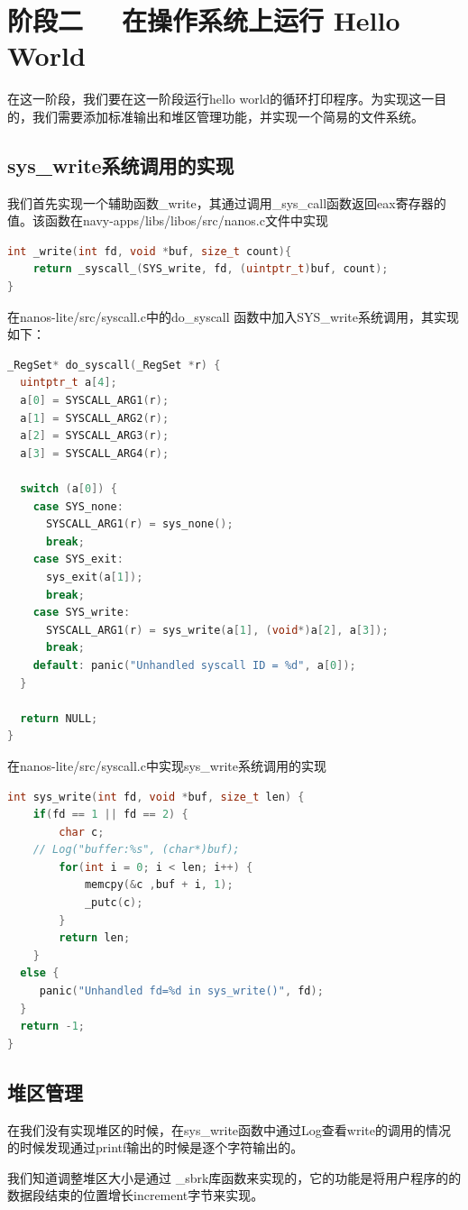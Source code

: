 \documentclass[UTF8,a4paper,10pt]{ctexart}
\begin{document}
\section{阶段二 \ \ 
在操作系统上运行 Hello World}
在这一阶段，我们要在这一阶段运行hello world的循环打印程序。为实现这一目的，我们需要添加标准输出和堆区管理功能，并实现一个简易的文件系统。
\subsection{sys\_write系统调用的实现}
我们首先实现一个辅助函数\_write，其通过调用\_sys\_call函数返回eax寄存器的值。该函数在navy-apps/libs/libos/src/nanos.c文件中实现
\begin{lstlisting}[language = C++]
int _write(int fd, void *buf, size_t count){
    return _syscall_(SYS_write, fd, (uintptr_t)buf, count);
}
\end{lstlisting}
在nanos-lite/src/syscall.c中的do\_syscall 函数中加入SYS\_write系统调用，其实现如下：
\begin{lstlisting}[language = C++]
_RegSet* do_syscall(_RegSet *r) {
  uintptr_t a[4];
  a[0] = SYSCALL_ARG1(r);
  a[1] = SYSCALL_ARG2(r);
  a[2] = SYSCALL_ARG3(r);
  a[3] = SYSCALL_ARG4(r);

  switch (a[0]) {
    case SYS_none: 
      SYSCALL_ARG1(r) = sys_none();
      break;
    case SYS_exit: 
      sys_exit(a[1]);
      break;
    case SYS_write:
      SYSCALL_ARG1(r) = sys_write(a[1], (void*)a[2], a[3]);
      break; 
    default: panic("Unhandled syscall ID = %d", a[0]);
  }

  return NULL;
}
\end{lstlisting}
在nanos-lite/src/syscall.c中实现sys\_write系统调用的实现
\begin{lstlisting}[language = C++]
int sys_write(int fd, void *buf, size_t len) {
	if(fd == 1 || fd == 2) {
		char c;
    // Log("buffer:%s", (char*)buf);
		for(int i = 0; i < len; i++) {
			memcpy(&c ,buf + i, 1);
			_putc(c);
		}
		return len;
	}
  else {
     panic("Unhandled fd=%d in sys_write()", fd);
  }
  return -1;
}
\end{lstlisting}
\subsection{堆区管理}
在我们没有实现堆区的时候，在sys\_write函数中通过Log查看write的调用的情况的时候发现通过printf输出的时候是逐个字符输出的。

我们知道调整堆区大小是通过 \_sbrk库函数来实现的，它的功能是将用户程序的的数据段结束的位置增长increment字节来实现。 
\end{document}
